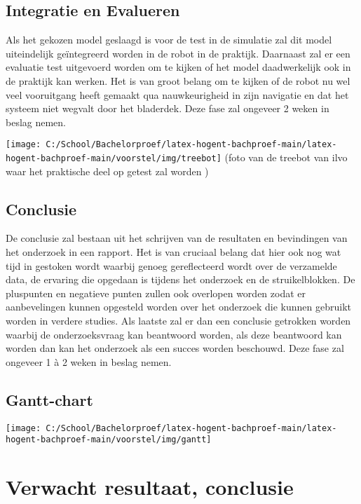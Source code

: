 \subsection{Integratie en Evalueren}

Als het gekozen model geslaagd is voor de test in de simulatie zal dit model uiteindelijk geïntegreerd worden in de robot in de praktijk.
Daarnaast zal er een evaluatie test uitgevoerd worden om te kijken of het model daadwerkelijk ook in de praktijk kan werken.
Het is van groot belang om te kijken of de robot nu wel veel vooruitgang heeft gemaakt qua nauwkeurigheid in zijn navigatie en dat het systeem niet wegvalt door het bladerdek.
Deze fase zal ongeveer 2 weken in beslag nemen.

\texttt{[image: C:/School/Bachelorproef/latex-hogent-bachproef-main/latex-hogent-bachproef-main/voorstel/img/treebot]}
(foto van de treebot van ilvo waar het praktische deel op getest zal worden
)
\subsection{Conclusie}

De conclusie zal bestaan uit het schrijven van de resultaten en bevindingen van het onderzoek in een rapport.
Het is van cruciaal belang dat hier ook nog wat tijd in gestoken wordt waarbij genoeg gereflecteerd wordt over de verzamelde data, de ervaring die opgedaan is tijdens het onderzoek en de struikelblokken.
De pluspunten en negatieve punten zullen ook overlopen worden zodat er aanbevelingen kunnen opgesteld worden over het onderzoek die kunnen gebruikt worden in verdere studies.
Als laatste zal er dan een conclusie getrokken worden waarbij de onderzoeksvraag kan beantwoord worden, als deze beantwoord kan worden dan kan het onderzoek als een succes worden beschouwd.
Deze fase zal ongeveer 1 à 2 weken in beslag nemen.

\subsection{Gantt-chart}

\texttt{[image: C:/School/Bachelorproef/latex-hogent-bachproef-main/latex-hogent-bachproef-main/voorstel/img/gantt]}

\section{Verwacht resultaat, conclusie}%
\label{sec:verwachte_resultaten}

